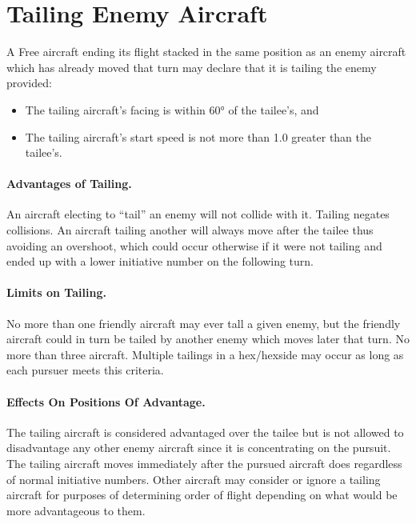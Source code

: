 \section
{Tailing Enemy Aircraft}

A Free aircraft ending its flight stacked in the same position as an enemy aircraft which has already moved that turn may declare that it is tailing the enemy provided:

\begin{itemize}

    \item The tailing aircraft's facing is within 60° of the tailee's, and
    
    \item The tailing aircraft's start speed is not more than 1.0 greater than the tailee's.

\end{itemize}

\paragraph{Advantages of Tailing.} An aircraft electing to “tail” an enemy will not collide with it. Tailing negates collisions. An aircraft tailing another will always move after the tailee thus avoiding an overshoot, which could occur otherwise if it were not tailing and ended up with a lower initiative number on the following turn.

\paragraph{Limits on Tailing.} No more than one friendly aircraft may ever tall a given enemy, but the friendly aircraft could in turn be tailed by another enemy which moves later that turn. No more than three aircraft.  Multiple tailings in a hex/hexside may occur as long as each pursuer meets this criteria.

\paragraph{Effects On Positions Of Advantage.} The tailing aircraft is considered advantaged over the tailee but is not allowed to disadvantage any other enemy aircraft since it is concentrating on the pursuit. The tailing aircraft moves immediately after the pursued aircraft does regardless of normal initiative numbers. Other aircraft may consider or ignore a tailing aircraft for purposes of determining order of flight depending on what would be more advantageous to them.

